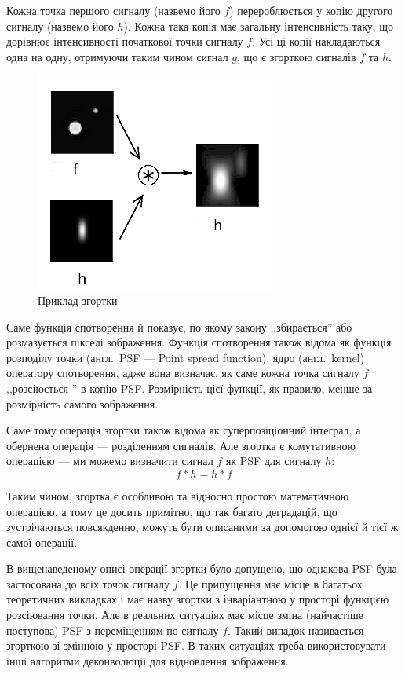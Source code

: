 \documentclass{diploma}
\begin{document}
      Кожна точка першого сигналу (назвемо його $f$) перероблюється у копію
      другого сигналу (назвемо його $h$).
      Кожна така копія має загальну інтенсивність таку, що дорівнює
      інтенсивності початкової точки сигналу $f$.
      Усі ці копії накладаються одна на одну, отримуючи таким чином сигнал
      $g$, що є згорткою сигналів $f$ та $h$.

      \begin{figure}[!htp]
        \centering
        \includegraphics{conv.png}
        \caption{Приклад згортки}
        \label{fig:example-convolution}
      \end{figure}

      Саме функція спотворення й показує, по якому закону ,,збирається'' або
      розмазується пікселі зображення.
      Функція спотворення також відома як функція розподілу точки
      (англ.~PSF --- Point spread function), ядро (англ.~kernel)
      оператору спотворення, адже вона визначає, як саме кожна точка сигналу
      $f$ ,,розсіюється '' в копію PSF.
      Розмірність цієї функції, як правило, менше за розмірність самого
      зображення.

      Саме тому операція згортки також відома як суперпозіціонний
      інтеграл, а обернена операція --- розділенням сигналів.
      Але згортка є комутативною операцією --- ми можемо визначити сигнал $f$
      як PSF для сигналу $h$:
      \[ f * h = h * f \]

      Таким чином, згортка є особливою та відносно простою математичною
      операцією, а тому це досить примітно, що так багато деградацій, що
      зустрічаються повсякденно, можуть бути описаними за допомогою однієї й
      тієї ж самої операції.

      В вищенаведеному описі операції згортки було допущено, що однакова PSF
      була застосована до всіх точок сигналу $f$.
      Це припущення має місце в багатьох теоретичних викладках і має назву
      згортки з інваріантною у просторі функцією розсіювання точки.
      Але в реальних ситуаціях має місце зміна (найчастіше поступова) PSF з
      переміщенням по сигналу $f$.
      Такий випадок називається згорткою зі змінною у просторі PSF.
      В таких ситуаціях треба використовувати інші алгоритми деконволюції для
      відновлення зображення.\cite{book2}
\end{document}
